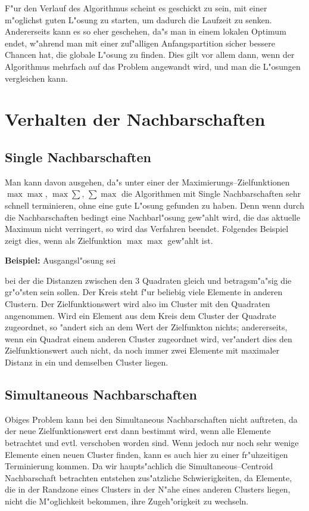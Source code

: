 F"ur den Verlauf des Algorithmus scheint es geschickt zu sein,
mit einer m"oglichst guten L"osung zu starten, 
um dadurch die Laufzeit zu senken.
Andererseits kann es so eher geschehen, da"s man in einem lokalen 
Optimum endet, 
w"ahrend man mit einer zuf"alligen Anfangspartition sicher bessere
Chancen hat, die globale L"osung zu finden.
Dies gilt vor allem dann, wenn der Algorithmus mehrfach auf das
Problem angewandt wird, und man die L"osungen vergleichen kann.


\section{Verhalten der Nachbarschaften}
\subsection*{Single Nachbarschaften}

Man kann davon ausgehen, da"s 
unter einer der Maximierungs--Zielfunktionen $\max\max$, $\max \sum$,
$\sum\max$
die Algorithmen mit Single Nachbarschaften 
sehr schnell terminieren, ohne
eine gute L"osung gefunden zu haben. Denn wenn durch die 
Nachbarschaften bedingt eine Nachbarl"osung gew"ahlt wird, die das
aktuelle Maximum nicht verringert, so wird das Verfahren beendet.
Folgendes Beispiel zeigt dies, wenn als Zielfunktion $\max\max$
gew"ahlt ist.

{\bf Beispiel:}
Ausgangsl"osung sei

\begin{center}

\end{center}

bei der die Distanzen zwischen den 3 Quadraten gleich und 
betragsm"a"sig die gr"o"sten sein sollen. 
Der Kreis steht f"ur beliebig viele Elemente in anderen Clustern.
Der Zielfunktionswert wird also im Cluster mit den Quadraten angenommen.
Wird ein Element aus dem Kreis dem Cluster der Quadrate zugeordnet, 
so "andert sich an dem Wert der Zielfunkton nichts; andererseits, 
wenn ein Quadrat einem anderen Cluster zugeordnet wird, ver"andert
dies den Zielfunktionswert auch nicht, da noch immer zwei Elemente mit
maximaler Distanz in ein und demselben Cluster liegen.

\subsection*{Simultaneous Nachbarschaften}
\label{combined}
Obiges Problem kann bei den Simultaneous Nachbarschaften nicht auftreten,
da der neue Zielfunktionswert erst dann bestimmt wird, wenn alle Elemente
betrachtet und evtl. verschoben worden sind. Wenn jedoch nur noch sehr wenige
Elemente einen  neuen Cluster finden, kann es auch hier zu einer
fr"uhzeitigen Terminierung kommen. Da wir haupts"achlich die
Simultaneous--Centroid Nachbarschaft betrachten entstehen zus"atzliche
Schwierigkeiten, da Elemente, die in der Randzone eines Clusters in der
N"ahe eines anderen Clusters liegen, nicht die M"oglichkeit bekommen, 
ihre Zugeh"origkeit zu wechseln.

